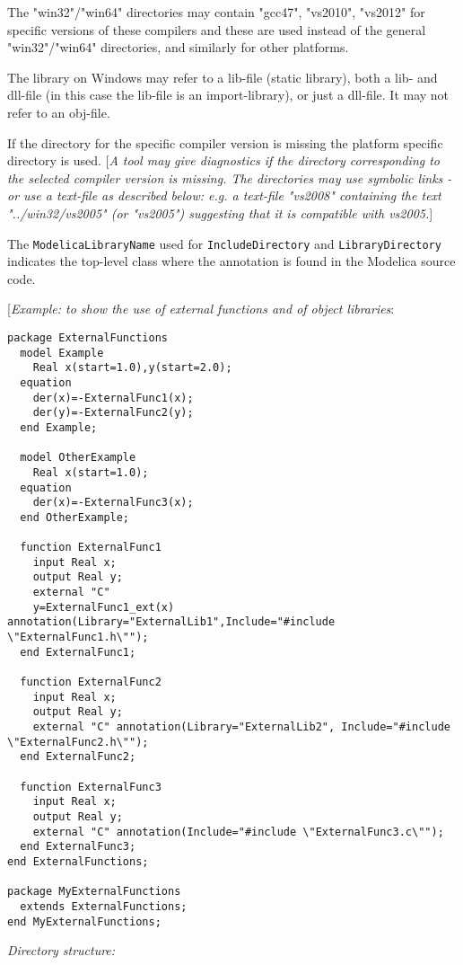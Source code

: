 The "win32"/"win64" directories may contain "gcc47", "vs2010", "vs2012"
for specific versions of these compilers and these are used instead of
the general "win32"/"win64" directories, and similarly for other
platforms.

The library on Windows may refer to a lib-file (static library), both a lib- and dll-file (in this case the lib-file is an import-library),
or just a dll-file. It may not refer to an obj-file.

If the directory for the specific compiler version is missing the
platform specific directory is used. {[}\emph{A tool may give
diagnostics if the directory corresponding to the selected compiler
version is missing. The directories may use symbolic links - or use a
text-file as described below: e.g. a text-file "vs2008" containing the
text "../win32/vs2005" (or "vs2005") suggesting that it is compatible
with vs2005.}{]}

The \lstinline!ModelicaLibraryName! used for \lstinline!IncludeDirectory! and \lstinline!LibraryDirectory!
indicates the top-level class where the annotation is found in the
Modelica source code.

{[}\emph{Example: to show the use of external functions and of object
libraries}:

\begin{lstlisting}[language=modelica]
package ExternalFunctions
  model Example
    Real x(start=1.0),y(start=2.0);
  equation
    der(x)=-ExternalFunc1(x);
    der(y)=-ExternalFunc2(y);
  end Example;

  model OtherExample
    Real x(start=1.0);
  equation
    der(x)=-ExternalFunc3(x);
  end OtherExample;

  function ExternalFunc1
    input Real x;
    output Real y;
    external "C"
    y=ExternalFunc1_ext(x) annotation(Library="ExternalLib1",Include="#include \"ExternalFunc1.h\"");
  end ExternalFunc1;

  function ExternalFunc2
    input Real x;
    output Real y;
    external "C" annotation(Library="ExternalLib2", Include="#include \"ExternalFunc2.h\"");
  end ExternalFunc2;

  function ExternalFunc3
    input Real x;
    output Real y;
    external "C" annotation(Include="#include \"ExternalFunc3.c\"");
  end ExternalFunc3;
end ExternalFunctions;

package MyExternalFunctions
  extends ExternalFunctions;
end MyExternalFunctions;
\end{lstlisting}
\emph{Directory structure:}

